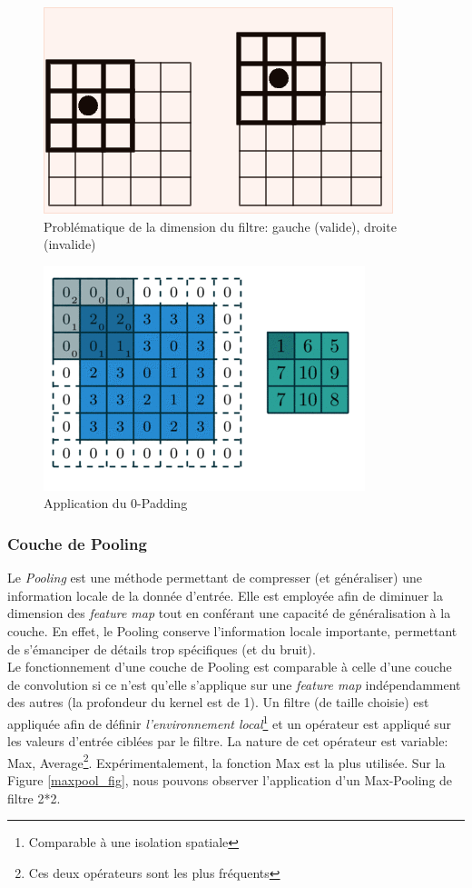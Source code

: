 \begin{figure}
    \centering
    \includegraphics[scale=0.4]{./tex/convolution-network/cnn/padding.png}
    \caption{Problématique de la dimension du filtre: gauche (valide), droite (invalide)}
    \label{centre_pb}
\end{figure}

\begin{figure}
    \centering
    \includegraphics[scale=0.4]{./tex/convolution-network/cnn/padding_.png}
    \caption{Application du 0-Padding}
    \label{padding}
\end{figure}

\subsubsection{Couche de Pooling}
Le \textit{Pooling} est une méthode permettant de compresser (et généraliser) une information locale de la donnée d'entrée. Elle est employée afin de diminuer la dimension des \textit{feature map} tout en conférant une capacité de généralisation à la couche. En effet, le Pooling conserve l'information locale importante, permettant de s'émanciper de détails trop spécifiques (et du bruit).\\

\noindent Le fonctionnement d'une couche de Pooling est comparable à celle d'une couche de convolution si ce n'est qu'elle s'applique sur une \textit{feature map} indépendamment des autres (la profondeur du kernel est de 1). Un filtre (de taille choisie) est appliquée afin de définir \textit{l'environnement local}\footnote{Comparable à une isolation spatiale} et un opérateur est appliqué sur les valeurs d'entrée ciblées par le filtre. La nature de cet opérateur est variable: Max, Average\footnote{Ces deux opérateurs sont les plus fréquents}. Expérimentalement, la fonction Max est la plus utilisée. Sur la Figure \ref{maxpool_fig}, nous pouvons observer l'application d'un Max-Pooling de filtre 2*2.\\

